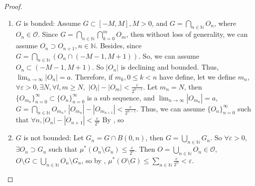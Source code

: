 \documentclass{ctexart}
\begin{document}
\begin{proof}
  \begin{enumerate}
    \item \(G\) is bonded:  Assume \(G \subset [-M,M],M >0\), and
      \(G =\bigcap_{n \in \mathbb{N}} O_n\), where \(O_n \in \mathcal{O}\).
      Since \(G = \bigcap_{n \in \mathbb{N}} \bigcap_{k = 0}^{m} O_m  \), then without loss of generality,
      we can assume \(O_n \supset O_{n+1}, n \in \mathbb{N}\).
      Besides, since \(G=\bigcap_{n \in \mathbb{N}} (O_n \cap (-M - 1,M + 1))\). 
      So, we can assume \(O_n \subset (-M-1,M+1)\).
      So \(|O_n | \) is declining and bounded. Thus, \(\lim_{n \to \infty} |O_n | = a\).
      Therefore, if \(m_k , 0 \leq k < n\) have define, let we define \(m_n\),
      \(\forall \varepsilon > 0, \exists N, \forall l, m \geq N, \) \( |O_{l}|-|O_{m}|<\frac{\varepsilon}{ 2^{n-1}}\).
      Let \(m_n=N\), then \(\{O_{m_{n}}\}_{n=0}^{\infty} \subset \{O_n\}_{n=0}^{\infty}\) is a sub sequence, and \(\lim_{n \to \infty} |O_{m_n}|=a\),
      \(G = \bigcap_{n \in \mathbb{N}} O_{m_n} \), \(|O_{m_{n}}|-|O_{m_{n+1}}|<\frac{\varepsilon}{2^{n-1}}\).
      Thus, we can assume \(\{O_{n}\}_{n=0}^{\infty}\) such that \(\forall n, |O_n| - |O_{n+1}| < \frac{\varepsilon}{2^{n}}\)
      By , so 
 \iffalse   
      \begin{equation}
        \begin{aligned} 
          \,\, &(\mu^*(O_{n} \setminus\ G )\\
  \,\,  \,\,= &\mu^* (\bigcup_{k \geq n} O_k \setminus O_{k+1} )\\ 
  \,\,\,\, \leq& \sum_{k \geq n} \mu^* (O_k- O_{k+1})\\
     = &\sum_{k \leq n} |O_{k}| - |O_{k+1}| \\
     \leq &\frac{\varepsilon}{2^{n}}<\varepsilon \).
     \end{aligned}
\,\,\,\,\,\, \end{equation}
\fi
  \item \(G\) is not bounded: Let \(G_n = G \cap B(0,n) \), then \(G = \bigcup_{n \in \mathbb{N}} G_n\).
  So \(\forall \varepsilon >0 \), \(\exists O_n \supset G_n \) such that \(\mu^*(O_n \setminus G_n ) \leq \frac{\varepsilon}{ 2^{n}}\).
  Then \(O = \bigcup_{n \in \mathbb{N}} O_n \in \mathcal{O}\), \( O \setminus G \subset \bigcup_{n \in \mathbb{N}} O_n \setminus G_n\),
  so by , \(\mu^*(O \setminus G) \leq \sum_{n \in \mathbb{N}} \frac{\varepsilon}{ 2^{n}}  < \varepsilon\).
  \end{enumerate}
\end{proof}
\end{document}
